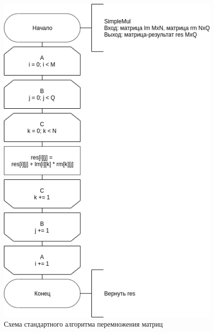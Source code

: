 \begin{figure}[h]
	\centering
	\includegraphics[scale=1]{schemes/simple}
	\caption{Схема стандартного алгоритма перемножения матриц}
	\label{scheme:simple}
\end{figure}

